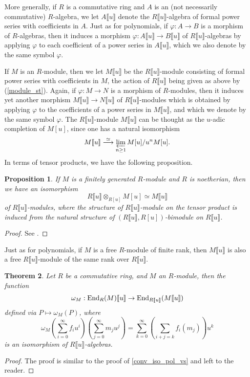 \documentclass[11pt]{amsart}
\newtheorem{theorem}{Theorem}[section]
\newtheorem{proposition}[theorem]{Proposition}
\numberwithin{equation}{section}
\theoremstyle{remark}
\theoremstyle{definition}
\begin{document}
More generally, if $R$ is a commutative ring and $A$ is an (not necessarily commutative) $R$-algebra, we let $A \llbracket u \rrbracket$ denote the $R\llbracket u \rrbracket$-algebra of formal power series with coefficients in $A$.  Just as for polynomials, if $\varphi:A \rightarrow B$ is a morphism of $R$-algebras, then it induces a morphism $\varphi:A \llbracket u \rrbracket \rightarrow B \llbracket u \rrbracket$ of $R\llbracket u \rrbracket$-algebras by applying $\varphi$ to each coefficient of a power series in $A \llbracket u \rrbracket$, which we also denote by the same symbol $\varphi$.

If $M$ is an $R$-module, then we let $M\llbracket u \rrbracket$ be the $R\llbracket u \rrbracket$-module consisting of formal power series with coefficients in $M$, the action of $R\llbracket u \rrbracket$ being given as above by (\ref{module_st}).  Again, if $\varphi:M \rightarrow N$ is a morphism of $R$-modules, then it induces yet another morphism $M\llbracket u \rrbracket \rightarrow N\llbracket u \rrbracket$ of $R\llbracket u \rrbracket$-modules which is obtained by applying $\varphi$ to the coefficients of a power series in $M\llbracket u \rrbracket$, and which we denote by the same symbol $\varphi$.  The $R\llbracket u \rrbracket$-module $M\llbracket u \rrbracket$ can be thought as the $u$-adic completion of $M[u]$, since one has a natural isomorphism
$$M\llbracket u \rrbracket \stackrel{\simeq}{\longrightarrow} \varprojlim_{n \ge 1} M[u]/u^{n}M[u]. $$  
In terms of tensor products, we have the following proposition.
\begin{proposition}\label{comp_base_change}
If $M$ is a finitely generated $R$-module and $R$ is noetherian, then we have an isomorphism
$$ R \llbracket u \rrbracket \otimes_{R[u]}M[u] \simeq M\llbracket u \rrbracket $$
of $R\llbracket u \rrbracket$-modules, where the structure of $R\llbracket u \rrbracket$-module on the tensor product is induced from the natural structure of $(R\llbracket u \rrbracket,R[u])$-bimodule on $R \llbracket u \rrbracket$.  
\end{proposition} 
\begin{proof}
See \cite[Proposition 10.13]{Atiyah/MacDonald:1969}.
\end{proof}
Just as for polynomials, if $M$ is a free $R$-module of finite rank, then $M\llbracket u \rrbracket$ is also a free $R\llbracket u \rrbracket$-module of the same rank over $R \llbracket u \rrbracket$.  

\begin{theorem} \label{conv_iso}
Let $R$ be a commutative ring, and $M$ an $R$-module, then the function 
$$\omega_{M}:{\rm End}_{R}(M)\llbracket u \rrbracket \rightarrow {\rm End}_{R\llbracket u \rrbracket}(M \llbracket u \rrbracket)$$ 
defined via $P \mapsto \omega_{M}(P)$, where
$$\omega_{M}\left( \sum_{i=0}^{\infty}f_{i}u^{i}\right)\left(\sum_{j=0}^{\infty}m_{j}u^{j}\right) = \sum_{k=0}^{\infty} \left(\sum_{i+j = k}f_{i}(m_{j})\right)u^{k} $$
is an isomorphism of $R\llbracket u \rrbracket$-algebras.
\end{theorem}
\begin{proof}
The proof is similar to the proof of \cref{conv_iso_pol_vs} and left to the reader.
\end{proof}
\end{document}
